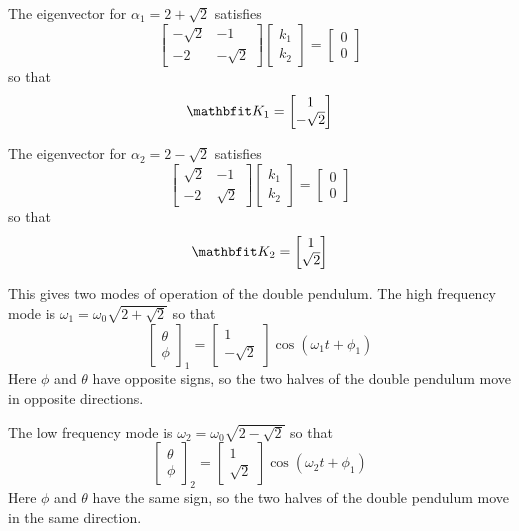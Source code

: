 \begin{example}
The eigenvector for $\alpha_1=2+\sqrt{2}$ satisfies
$$\begin{bmatrix} -\sqrt{2}&-1\\-2&-\sqrt{2}\end{bmatrix}
\begin{bmatrix} k_1\\k_2\end{bmatrix}=
\begin{bmatrix} 0\\0\end{bmatrix}$$
so that
$$\vect{K}_1=\begin{bmatrix} 1\\-\sqrt{2}\end{bmatrix}$$

The eigenvector for $\alpha_2=2-\sqrt{2}$ satisfies
$$\begin{bmatrix} \sqrt{2}&-1\\-2&\sqrt{2}\end{bmatrix}
\begin{bmatrix} k_1\\k_2\end{bmatrix}=
\begin{bmatrix} 0\\0\end{bmatrix}$$
so that
$$\vect{K}_2=\begin{bmatrix} 1\\\sqrt{2}\end{bmatrix}$$

This gives two modes of operation of the double pendulum.  The high
frequency mode is $\omega_1=\omega_0\sqrt{2+\sqrt{2}}$ so that
$$\begin{bmatrix}\theta\\\phi\end{bmatrix}_1
=\begin{bmatrix} 1\\-\sqrt{2}\end{bmatrix}
\cos(\omega_{1}t+\phi_1)$$
Here $\phi$ and $\theta$ have opposite signs, so the two halves of the
double pendulum move in opposite directions.

The low frequency mode is $\omega_2=\omega_0\sqrt{2-\sqrt{2}}$ so that
$$\begin{bmatrix}\theta\\\phi\end{bmatrix}_2
=\begin{bmatrix} 1\\\sqrt{2}\end{bmatrix}
\cos(\omega_{2}t+\phi_1)$$
Here $\phi$ and $\theta$ have the same sign, so the two halves of the
double pendulum move in the same direction.
\end{example}


